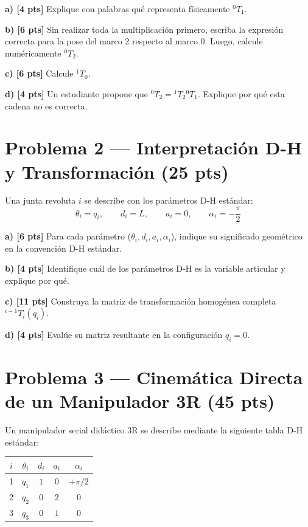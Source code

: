 \documentclass[11pt, a4paper]{article}
\begin{document}
\textbf{a) [4 pts]} Explique con palabras qué representa físicamente ${}^{0}T_1$.

\textbf{b) [6 pts]} Sin realizar toda la multiplicación primero, escriba la expresión correcta para la pose del marco 2 respecto al marco 0. Luego, calcule numéricamente ${}^{0}T_2$.

\textbf{c) [6 pts]} Calcule ${}^{1}T_0$.

\textbf{d) [4 pts]} Un estudiante propone que ${}^{0}T_2 = {}^1T_2{}^0T_1$. Explique por qué esta cadena no es correcta.

\section*{Problema 2 — Interpretación D-H y Transformación (25 pts)}
Una junta revoluta $i$ se describe con los parámetros D-H estándar:
\begin{equation*}
    \theta_i = q_i, \qquad d_i = L, \qquad a_i = 0, \qquad \alpha_i = -\frac{\pi}{2}
\end{equation*}

\textbf{a) [6 pts]} Para cada parámetro ($\theta_i, d_i, a_i, \alpha_i$), indique su significado geométrico en la convención D-H estándar.

\textbf{b) [4 pts]} Identifique cuál de los parámetros D-H es la variable articular y explique por qué.

\textbf{c) [11 pts]} Construya la matriz de transformación homogénea completa ${}^{i-1}T_i(q_i)$.

\textbf{d) [4 pts]} Evalúe su matriz resultante en la configuración $q_i = 0$.

\section*{Problema 3 — Cinemática Directa de un Manipulador 3R (45 pts)}
Un manipulador serial didáctico 3R se describe mediante la siguiente tabla D-H estándar:

\begin{center}
    \begin{tabular}{c c c c c}
    \toprule
    $i$ & $\theta_i$ & $d_i$ & $a_i$ & $\alpha_i$ \\ \midrule
    1 & $q_1$ & $1$ & $0$ & $+\pi/2$ \\
    2 & $q_2$ & $0$ & $2$ & $0$ \\
    3 & $q_3$ & $0$ & $1$ & $0$ \\ \bottomrule
    \end{tabular}
\end{center}
\end{document}
